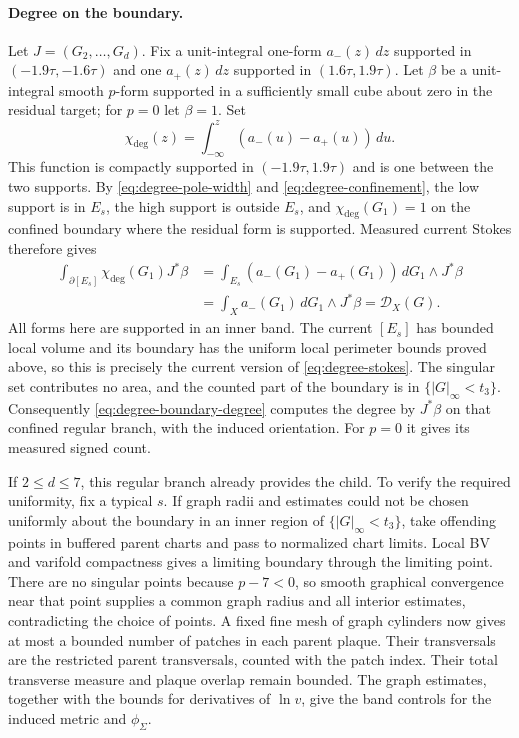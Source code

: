 \paragraph{Degree on the boundary.}
Let $J=(G_2,\ldots,G_d)$.  Fix a unit-integral one-form
$a_-(z)\,dz$ supported in $(-1.9\tau,-1.6\tau)$ and one
$a_+(z)\,dz$ supported in $(1.6\tau,1.9\tau)$.  Let $\beta$ be a
unit-integral smooth $p$-form supported in a sufficiently small cube
about zero in the residual target; for $p=0$ let $\beta=1$.  Set
\[
 \chi_{\mathrm{deg}}(z)=\int_{-\infty}^{z}(a_-(u)-a_+(u))\,du.
\]
This function is compactly supported in $(-1.9\tau,1.9\tau)$ and is one
between the two supports.  By \eqref{eq:degree-pole-width} and
\eqref{eq:degree-confinement}, the low support is in $E_s$, the high
support is outside $E_s$, and $\chi_{\mathrm{deg}}(G_1)=1$ on the confined
boundary where the residual form is supported.  Measured current Stokes therefore gives
\begin{equation}\label{eq:degree-boundary-degree}
 \begin{split}
 \int_{\partial[E_s]} \chi_{\mathrm{deg}}(G_1)J^*\beta
   &=\int_{E_s}(a_-(G_1)-a_+(G_1))\,dG_1\wedge J^*\beta\\
   &=\int_Xa_-(G_1)\,dG_1\wedge J^*\beta
     =\mathcal D_X(G).
 \end{split}
\end{equation}
All forms here are supported in an inner band.  The current $[E_s]$ has
bounded local volume and its boundary has the uniform local perimeter
bounds proved above, so this is precisely the current version of
\eqref{eq:degree-stokes}.  The singular set contributes no area, and
the counted part of the boundary is in $\{|G|_\infty<t_3\}$.
Consequently \eqref{eq:degree-boundary-degree} computes the degree by
$J^*\beta$ on that confined regular branch, with the induced orientation.
For $p=0$ it gives its measured signed count.

If $2\le d\le7$, this regular branch already provides the child.  To verify
the required uniformity, fix a typical $s$.  If graph radii and estimates
could not be chosen uniformly about the boundary in an inner region of
$\{|G|_\infty<t_3\}$, take offending points in buffered parent charts
and pass to normalized chart limits.  Local BV and varifold compactness
gives a limiting boundary through the limiting point.  There are no
singular points because $p-7<0$, so smooth graphical convergence near
that point supplies a common graph radius and all interior estimates,
contradicting the choice of points.  A fixed fine mesh of graph cylinders
now gives at most a bounded number of patches in each parent plaque.
Their transversals are the restricted parent transversals, counted with
the patch index.  Their total transverse measure and plaque overlap
remain bounded.  The graph estimates, together with the bounds for
derivatives of $\ln v$, give the band controls for the induced metric and
$\phi_\Sigma$.

